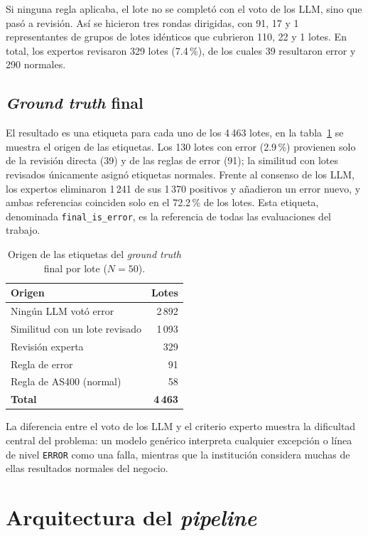 Si ninguna regla aplicaba, el lote no se completó con el voto de los LLM, sino que pasó a revisión. Así se hicieron tres rondas dirigidas, con 91, 17 y 1 representantes de grupos de lotes idénticos que cubrieron 110, 22 y 1 lotes. En total, los expertos revisaron 329 lotes (7.4\,\%), de los cuales 39 resultaron error y 290 normales.

\subsection{\textit{Ground truth} final}

El resultado es una etiqueta para cada uno de los 4\,463 lotes, en la tabla~\ref{tab:met_origen} se muestra el origen de las etiquetas. Los 130 lotes con error (2.9\,\%) provienen solo de la revisión directa (39) y de las reglas de error (91); la similitud con lotes revisados únicamente asignó etiquetas normales. Frente al consenso de los LLM, los expertos eliminaron 1\,241 de sus 1\,370 positivos y añadieron un error nuevo, y ambas referencias coinciden solo en el 72.2\,\% de los lotes. Esta etiqueta, denominada \texttt{final\_is\_error}, es la referencia de todas las evaluaciones del trabajo.

\begin{table}[H]
\centering
\caption{Origen de las etiquetas del \textit{ground truth} final por lote ($N=50$).}
\label{tab:met_origen}
\small
\begin{tabular}{@{}lr@{}}
\toprule
\textbf{Origen} & \textbf{Lotes} \\
\midrule
Ningún LLM votó error & 2\,892 \\
Similitud con un lote revisado & 1\,093 \\
Revisión experta & 329 \\
Regla de error & 91 \\
Regla de AS400 (normal) & 58 \\
\midrule
\textbf{Total} & \textbf{4\,463} \\
\bottomrule
\end{tabular}
\normalsize
\end{table}

La diferencia entre el voto de los LLM y el criterio experto muestra la dificultad central del problema: un modelo genérico interpreta cualquier excepción o línea de nivel \texttt{ERROR} como una falla, mientras que la institución considera muchas de ellas resultados normales del negocio.

\section{Arquitectura del \textit{pipeline}}\label{sec:met_arquitectura}

